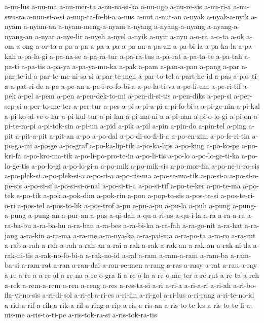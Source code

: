 {a-nu-lus a-nu-ma a-nu-mer-ta a-nu-na-si-ka a-nu-ngo a-nu-re-sis a-nu-ri-a
a-nu-swa-ra a-nun-si-a-si a-nup-ta-fo-bi-a a-nus a-nut a-nut-an a-nyak
a-nyak-a-nyik a-nyam a-nyam-an a-nyam-meng-a-nyam a-nyang a-nyang-a-nyang
a-nyang-a-nyang-an a-nyar a-nye-lir a-nyeh a-nyel a-nyik a-nyir a-nyu
a-o-ra a-o-ta a-ok a-om a-ong a-or-ta a-pa a-pa-a-pa a-pa-a-pa-an a-pa-an
a-pa-bi-la a-pa-ka-la a-pa-kah a-pa-la-gi a-pa-na-se a-pa-ra-tur
a-pa-ra-tus a-pa-rat a-pa-ta-te a-pa-tah a-pa-ti a-pa-tis a-pa-ya
a-pa-ya-mu-ka a-pak a-pam a-pan-a-pan a-pang a-par a-par-te-id
a-par-te-me-ni-sa-si a-par-te-men a-par-to-tel a-part-he-id a-pas
a-pas-ti-a a-pat-ri-de a-pe a-pe-an a-pe-i-ro-fo-bi-a a-pe-la-ti-va
a-pe-li-um a-pe-ri-tif a-pek a-pel a-pem a-pen a-pen-dek-to-mi
a-pen-di-si-tis a-pen-diks a-pep-si a-per-sep-si a-per-to-me-ter a-per-tur
a-pes a-pi a-pi-a-pi a-pi-fo-bi-a a-pi-ge-nin a-pi-kal a-pi-ko-al-ve-o-lar
a-pi-kul-tur a-pi-lan a-pi-ma-ni-a a-pi-nan a-pi-o-lo-gi a-pi-on
a-pi-te-ra-pi a-pi-tok-sin a-pi-un a-pid a-pik a-pil a-pin a-pin-do
a-pin-tel a-ping a-pit a-pit-a-pit a-pit-an a-po a-po-dal
a-po-di-so-fi-li-a a-po-en-zim a-po-fe-ri-tin a-po-ga-mi a-po-ge a-po-graf
a-po-ka-lip-tik a-po-ka-lips a-po-king a-po-ko-pe a-po-kri-fa
a-po-kro-ma-tik a-po-li-po-pro-te-in a-po-li-tis a-po-lo a-po-lo-ge-ti-ka
a-po-lo-ge-tis a-po-lo-gi a-po-lo-gi-a a-po-mik a-po-mik-sis a-po-mor-fin
a-po-ne-u-ro-sis a-po-plek-si a-po-plek-si-a a-po-ri-a a-po-ris-ma
a-po-se-ma-tik a-po-si-a a-po-si-o-pe-sis a-po-si-si a-po-si-si-o-nal
a-po-si-ti-a a-po-si-tif a-po-te-ker a-po-te-ma a-po-tek a-po-tik a-pok
a-pok-dim a-pok-rin a-pon a-pop-to-sis a-pos-ta-si a-pos-te-ri-o-ri
a-pos-tel a-pos-to-lik a-pos-trof a-pu a-pu-a-pu a-pu-la a-puh a-pung
a-pung-a-pung a-pung-an a-pur-an a-pus a-qi-dah a-qu-a-ri-us a-qu-i-la
a-ra a-ra-a-ra a-ra-ba-bu a-ra-ba-hu a-ra-ban a-ra-bes a-ra-bi-ka a-ra-fah
a-ra-go-nit a-ra-hat a-ra-jang a-ra-kin a-ra-ma a-ra-me a-ra-nya-ka
a-ra-pai-ma a-ra-po-ta a-ra-ro a-ra-rut a-rab a-rah a-rah-a-rah a-rah-an
a-rai a-rak a-rak-a-rak-an a-rak-an a-rak-ni-da a-rak-ni-tis
a-rak-no-fo-bi-a a-rak-no-id a-ral a-ram a-ram-a-ram a-ram-ba a-ram-ba-si
a-ram-rat a-ran a-ran-dai a-ran-se-men a-rang a-ras a-rasy a-rat a-rau
a-ray a-re a-re-a a-re-al a-re-na a-re-o-gra-fi a-re-o-la a-re-o-me-ter
a-re-rut a-re-ta a-reh a-rek a-rem-a-rem a-ren a-reng a-res a-res-ta-si
a-ri a-ri-a a-ri-a-ri a-ri-ah a-ri-bo-fla-vi-no-sis a-ri-di-sol a-ri-el
a-ri-es a-ri-fin a-ri-gol a-ri-lus a-ri-rang a-ri-te-no-id a-rid a-rif
a-rih a-rik a-ril a-ring a-rip a-ris a-ris-an a-ris-to-te-les
a-ris-to-te-li-a-nis-me a-ris-to-ti-pe a-ris-tok-ra-si a-ris-tok-ra-tis
}
